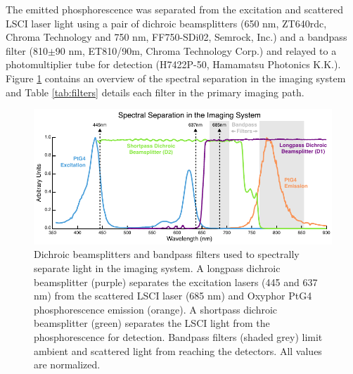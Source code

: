 The emitted phosphorescence was separated from the excitation and scattered LSCI laser light using a pair of dichroic beamsplitters (650 nm, ZT640rdc, Chroma Technology and 750 nm, FF750-SDi02, Semrock, Inc.) and a bandpass filter (810$\pm$90 nm, ET810/90m, Chroma Technology Corp.) and relayed to a photomultiplier tube for detection (H7422P-50, Hamamatsu Photonics K.K.). Figure \ref{fig:systemspectra} contains an overview of the spectral separation in the imaging system and Table \ref{tab:filters} details each filter in the primary imaging path.

\begin{figure}
    \includegraphics{figures/chapter_2/systemspectra.pdf}
    \caption{
        \label{fig:systemspectra}
        Dichroic beamsplitters and bandpass filters used to spectrally separate light in the imaging system. A longpass dichroic beamsplitter (purple) separates the excitation lasers (445 and 637 nm) from the scattered LSCI laser (685 nm) and Oxyphor PtG4 phosphorescence emission (orange). A shortpass dichroic beamsplitter (green) separates the LSCI light from the phosphorescence for detection. Bandpass filters (shaded grey) limit ambient and scattered light from reaching the detectors. All values are normalized.
    }
\end{figure}

